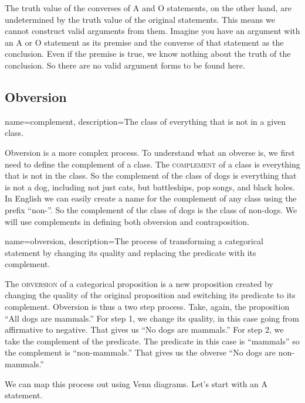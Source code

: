 The truth value of the converses of A and O statements, on the other hand, are undetermined by the truth value of the original statements. This means we cannot construct valid arguments from them. Imagine you have an argument with an A or O statement as its premise and the converse of that statement as the conclusion. Even if the premise is true, we know nothing about the truth of the conclusion. So there are no valid argument forms to be found here. 

\subsection{Obversion}

{
name=complement,
description={The class of everything that is not in a given class.}
}


Obversion is a more complex process. To understand what an obverse is, we first need to define the complement of a class. The \textsc{\gls{complement}} \label{def:Complement} of a class is everything that is not in the class. So the complement of the class of dogs is everything that is not a dog, including not just cats, but battleships, pop songs, and black holes. In English we can easily create a name for the complement of any class using the prefix ``non-''. So the complement of the class of dogs is the class of non-dogs. We will use complements in defining both obversion and contraposition. 

{
name=obversion,
description={The process of transforming a categorical statement by changing its quality and replacing the predicate with its complement.}
}


The \textsc{\gls{obversion}} \label{def:Obversion} of a categorical proposition is a new proposition created by changing the quality of the original proposition and switching its predicate to its complement. Obversion is thus a two step process. Take, again, the proposition ``All dogs are mammals.'' For step 1, we change its quality, in this case going from affirmative to negative. That gives us ``No dogs are mammals.'' For step 2, we take the complement of the predicate. The predicate in this case is ``mammals'' so the complement is ``non-mammals.'' That gives us the obverse ``No dogs are non-mammals.''

We can map this process out using Venn diagrams. Let's start with an A statement.

